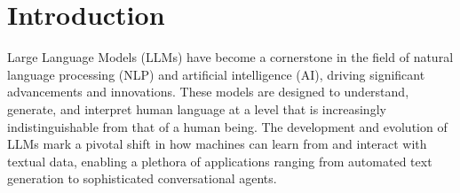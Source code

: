 \chapter{Introduction}
Large Language Models (LLMs) have become a cornerstone in the field of natural language processing (NLP) and artificial intelligence (AI), driving significant advancements and innovations. These models are designed to understand, generate, and interpret human language at a level that is increasingly indistinguishable from that of a human being. The development and evolution of LLMs mark a pivotal shift in how machines can learn from and interact with textual data, enabling a plethora of applications ranging from automated text generation to sophisticated conversational agents.
